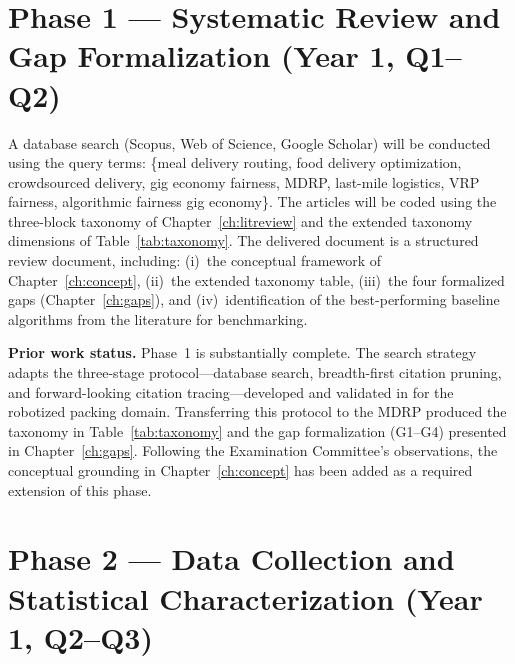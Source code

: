 \documentclass[12pt,a4paper]{report}
\begin{document}
\section{Phase 1 --- Systematic Review and Gap Formalization (Year 1, Q1--Q2)}
\label{sec:phase1}

A database search (Scopus, Web of Science, Google Scholar) will be conducted using the query terms: \{meal delivery routing, food delivery optimization, crowdsourced delivery, gig economy fairness, MDRP, last-mile logistics, VRP fairness, algorithmic fairness gig economy\}. The articles will be coded using the three-block taxonomy of Chapter~\ref{ch:litreview} and the extended taxonomy dimensions of
Table~\ref{tab:taxonomy}. The delivered document is a structured review document, including: (i)~the conceptual framework of Chapter~\ref{ch:concept}, (ii)~the extended taxonomy table, (iii)~the four formalized gaps
(Chapter~\ref{ch:gaps}), and (iv)~identification of the best-performing baseline algorithms from the literature for benchmarking.

\noindent\textbf{Prior work status.} Phase~1 is substantially complete. The search strategy adapts the three-stage protocol---database search, breadth-first citation pruning, and forward-looking citation tracing---developed and validated in \citet{pantoja2024comprehensive} for the robotized packing domain. Transferring this protocol to the MDRP produced the taxonomy in Table~\ref{tab:taxonomy} and the gap formalization (G1--G4) presented in Chapter~\ref{ch:gaps}. Following the Examination Committee's observations, the conceptual grounding in Chapter~\ref{ch:concept} has been added as a required extension of this phase.

\section{Phase 2 --- Data Collection and Statistical Characterization (Year 1, Q2--Q3)}
\label{sec:phase2}
\end{document}
